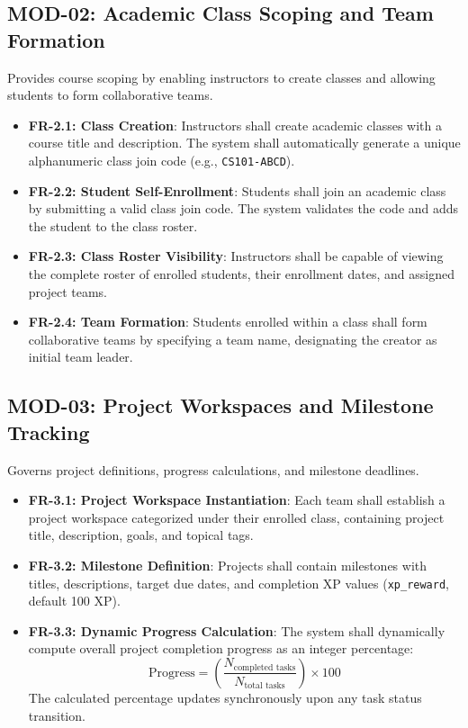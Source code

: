 \documentclass{scrreprt}
\begin{document}
\subsection{MOD-02: Academic Class Scoping and Team Formation}
Provides course scoping by enabling instructors to create classes and allowing students to form collaborative teams.
\begin{itemize}
    \item \textbf{FR-2.1: Class Creation}: Instructors shall create academic classes with a course title and description. The system shall automatically generate a unique alphanumeric class join code (e.g., \texttt{CS101-ABCD}).
    \item \textbf{FR-2.2: Student Self-Enrollment}: Students shall join an academic class by submitting a valid class join code. The system validates the code and adds the student to the class roster.
    \item \textbf{FR-2.3: Class Roster Visibility}: Instructors shall be capable of viewing the complete roster of enrolled students, their enrollment dates, and assigned project teams.
    \item \textbf{FR-2.4: Team Formation}: Students enrolled within a class shall form collaborative teams by specifying a team name, designating the creator as initial team leader.
\end{itemize}

\subsection{MOD-03: Project Workspaces and Milestone Tracking}
Governs project definitions, progress calculations, and milestone deadlines.
\begin{itemize}
    \item \textbf{FR-3.1: Project Workspace Instantiation}: Each team shall establish a project workspace categorized under their enrolled class, containing project title, description, goals, and topical tags.
    \item \textbf{FR-3.2: Milestone Definition}: Projects shall contain milestones with titles, descriptions, target due dates, and completion XP values (\texttt{xp\_reward}, default 100 XP).
    \item \textbf{FR-3.3: Dynamic Progress Calculation}: The system shall dynamically compute overall project completion progress as an integer percentage:
    \begin{equation}
        \text{Progress} = \left( \frac{N_{\text{completed tasks}}}{N_{\text{total tasks}}} \right) \times 100
    \end{equation}
    The calculated percentage updates synchronously upon any task status transition.
\end{itemize}
\end{document}
